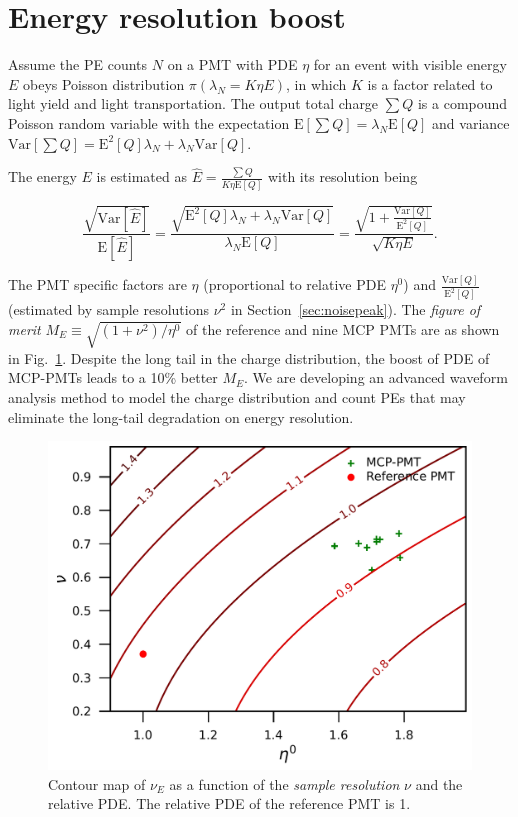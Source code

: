 \section{Energy resolution boost}
\label{Result}
Assume the PE counts $N$ on a PMT with PDE $\eta$ for an event with visible energy $E$ obeys Poisson distribution $\pi(\lambda_N=K\eta E)$, in which $K$ is a factor related to light yield and light transportation. The output total charge $\sum{Q}$ is a compound Poisson random variable with the expectation $\mathrm{E}[\sum{Q}]=\lambda_N\mathrm{E}[Q]$ and variance $\mathrm{Var}[\sum{Q}]=\mathrm{E}^2[Q]\lambda_N+\lambda_N\mathrm{Var}[Q]$.

The energy $E$ is estimated as $\hat{E}=\frac{\sum{Q}}{K\eta\mathrm{E}[Q]}$ with its resolution being

\begin{equation}
    \frac{\sqrt{\mathrm{Var}[\hat{E}]}}{\mathrm{E}[\hat{E}]}=\frac{\sqrt{\mathrm{E}^2[Q]\lambda_N+\lambda_N\mathrm{Var}[Q]}}{\lambda_N\mathrm{E}[Q]}=\frac{\sqrt{1+\frac{\mathrm{Var}[Q]}{\mathrm{E}^2[Q]}}}{\sqrt{K\eta E}}.
\end{equation}

The PMT specific factors are $\eta$ (proportional to relative PDE $\eta^0$) and $\frac{\mathrm{Var}[Q]}{\mathrm{E}^2[Q]}$ (estimated by sample resolutions $\nu^2$ in Section~\ref{sec:noisepeak}). The \emph{figure of merit} $M_{E}\equiv\sqrt{({1+\nu^2})/{\eta^0}}$ of the reference and nine MCP PMTs are as shown in Fig.~\ref{fig:EnergyResolution}. Despite the long tail in the charge distribution, the boost of PDE of MCP-PMTs leads to a 10\% better $M_{E}$. We are developing an advanced waveform analysis method to model the charge distribution and count PEs that may eliminate the long-tail degradation on energy resolution.
\begin{figure}[!htbp]
    \centering
    \includegraphics[width=\MF\textwidth]{figures/result/resolution.pdf}
    \caption{Contour map of $\nu_{E}$ as a function of the \emph{sample resolution} $\nu$ and the relative PDE. The relative PDE of the reference PMT is 1.}
    \label{fig:EnergyResolution}
\end{figure}
